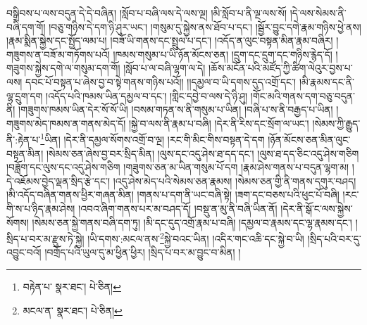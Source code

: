 བསྒྲིབས་པ་ལས་བདུན་དེ་དེ་བཞིན། །སློབ་པ་བཞི་ལས་དེ་ལས་ལྔ། །མི་སློབ་པ་ནི་ལྔ་ལས་སོ། །དེ་ལས་སེམས་ནི་བཞི་དག་གོ། །བཅུ་གཉིས་དེ་དག་ཉི་ཤུར་ཡང་། །གསུམ་དུ་སྐྱེས་ནས་ཐོབ་པ་དང་། །སྦྱོར་བྱུང་དགེ་རྣམ་གཉིས་ཕྱེ་ནས། །རྣམ་སྨིན་སྐྱེས་དང་སྤྱོད་ལམ་པ། །བཟོ་ཡི་གནས་དང་སྤྲུལ་པ་དང་། །འདོད་ན་ལུང་བསྟན་མིན་རྣམ་བཞིར། །གཟུགས་ན་བཟོ་མ་གཏོགས་པའོ། །ཁམས་གསུམ་པ་ཡི་ཉོན་མོངས་ཅན། །དྲུག་དང་དྲུག་དང་གཉིས་རྙེད་དོ། །གཟུགས་སྐྱེས་དགེ་ལ་གསུམ་དག་གོ། །སློབ་པ་ལ་བཞི་ལྷག་ལ་དེ། །ཆོས་མངོན་པའི་མཛོད་ཀྱི་ཚིག་ལེའུར་བྱས་པ་ལས། དབང་པོ་བསྟན་པ་ཞེས་བྱ་བ་སྟེ་གནས་གཉིས་པའོ།། །།དམྱལ་བ་ཡི་དགས་དུད་འགྲོ་དང་། །མི་རྣམས་དང་ནི་ལྷ་དྲུག་དག །འདོད་པའི་ཁམས་ཡིན་དམྱལ་བ་དང་། །གླིང་དབྱེ་བ་ལས་དེ་ཉི་ཤུ། །གོང་མའི་གནས་དག་བཅུ་བདུན་ནི། །གཟུགས་ཁམས་ཡིན་དེར་སོ་སོ་ཡི། །བསམ་གཏན་ས་ནི་གསུམ་པ་ཡིན། །བཞི་པ་ས་ནི་བརྒྱད་པ་ཡིན། །གཟུགས་མེད་ཁམས་ན་གནས་མེད་དོ། །སྐྱེ་བ་ལས་ནི་རྣམ་པ་བཞི། །དེར་ནི་རིས་དང་སྲོག་ལ་ཡང་། །སེམས་ཀྱི་རྒྱུད་ནི་:རྟེན་པ་\footnote{བརྟེན་པ་  སྣར་ཐང་།  པེ་ཅིན། }ཡིན། །དེར་ནི་དམྱལ་སོགས་འགྲོ་བ་ལྔ། །རང་གི་མིང་གིས་བསྟན་དེ་དག །ཉོན་མོངས་ཅན་མིན་ལུང་བསྟན་མིན། །སེམས་ཅན་ཞེས་བྱ་བར་སྲིད་མིན། །ལུས་དང་འདུ་ཤེས་ཐ་དད་དང་། །ལུས་ཐ་དད་ཅིང་འདུ་ཤེས་གཅིག །བཟློག་དང་ལུས་དང་འདུ་ཤེས་གཅིག །གཟུགས་ཅན་མ་ཡིན་གསུམ་པོ་དག །རྣམ་ཤེས་གནས་པ་བདུན་ལྷག་མ། །དེ་འཇོམས་བྱེད་ལྡན་སྲིད་རྩེ་དང་། །འདུ་ཤེས་མེད་པའི་སེམས་ཅན་རྣམས། །སེམས་ཅན་གྱི་ནི་གནས་དགུར་བཤད། །མི་འདོད་བཞིན་གནས་ཕྱིར་གཞན་མིན། །གནས་པ་དག་ནི་ཡང་བཞི་སྟེ། །ཟག་དང་བཅས་པའི་ཕུང་པོ་བཞི། །རང་གི་ས་པ་ཉིད་རྣམ་ཤེས། །འབའ་ཞིག་གནས་པར་མ་བཤད་དོ། །བསྡུ་ན་མུ་ནི་བཞི་ཡིན་ནོ། །དེར་ནི་སྒོ་ང་ལས་སྐྱེས་སོགས། །སེམས་ཅན་སྐྱེ་གནས་བཞི་དག་ཏུ། །མི་དང་དུད་འགྲོ་རྣམ་པ་བཞི། །དམྱལ་བ་རྣམས་དང་ལྷ་རྣམས་དང་། །སྲིད་པ་བར་མ་རྫུས་ཏེ་སྐྱེ། །ཡི་དགས་:མངལ་ནས་\footnote{མངལ་ན་  སྣར་ཐང་།  པེ་ཅིན། }སྐྱེ་བའང་ཡིན། །འདིར་གང་འཆི་དང་སྐྱེ་བ་ཡི། །སྲིད་པའི་བར་དུ་འབྱུང་བའོ། །བགྲོད་པའི་ཡུལ་དུ་མ་ཕྱིན་ཕྱིར། །སྲིད་པ་བར་མ་བྱུང་བ་མིན། །
